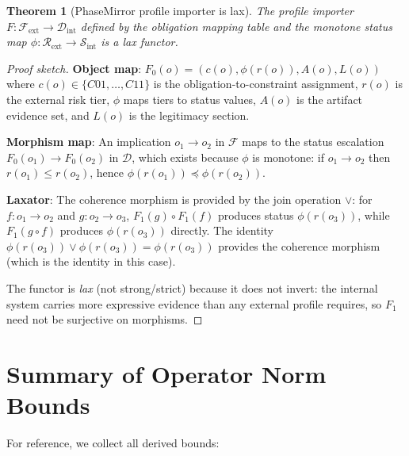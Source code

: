 \documentclass[11pt,letterpaper]{article}
\newtheorem{theorem}{Theorem}[section]
\theoremstyle{remark}
\begin{document}
\begin{theorem}[PhaseMirror profile importer is lax]
\label{thm:A-lax}
The profile importer $F : \mathcal{F}_{\text{ext}} \to \mathcal{D}_{\text{int}}$
defined by the obligation mapping table and the monotone status map
$\phi : \mathcal{R}_{\text{ext}} \to \mathcal{S}_{\text{int}}$ is a
lax functor.
\end{theorem}

\begin{proof}[Proof sketch]
\textbf{Object map}: $F_0(o) = (c(o), \phi(r(o)), A(o), L(o))$ where
$c(o) \in \{C01,\ldots,C11\}$ is the obligation-to-constraint assignment,
$r(o)$ is the external risk tier, $\phi$ maps tiers to status values,
$A(o)$ is the artifact evidence set, and $L(o)$ is the legitimacy section.

\textbf{Morphism map}: An implication $o_1 \to o_2$ in $\mathcal{F}$
maps to the status escalation $F_0(o_1) \to F_0(o_2)$ in $\mathcal{D}$,
which exists because $\phi$ is monotone:
if $o_1 \to o_2$ then $r(o_1) \leq r(o_2)$, hence
$\phi(r(o_1)) \preceq \phi(r(o_2))$.

\textbf{Laxator}: The coherence morphism is provided by the join
operation $\vee$: for $f : o_1 \to o_2$ and $g : o_2 \to o_3$,
$F_1(g) \circ F_1(f)$ produces status $\phi(r(o_3))$, while
$F_1(g \circ f)$ produces $\phi(r(o_3))$ directly. The identity
$\phi(r(o_3)) \vee \phi(r(o_3)) = \phi(r(o_3))$ provides the
coherence morphism (which is the identity in this case).

The functor is \emph{lax} (not strong/strict) because it does not
invert: the internal system carries more expressive evidence than
any external profile requires, so $F_1$ need not be surjective on
morphisms.
\end{proof}

\section{Summary of Operator Norm Bounds}
\label{sec:summary}

For reference, we collect all derived bounds:
\end{document}
